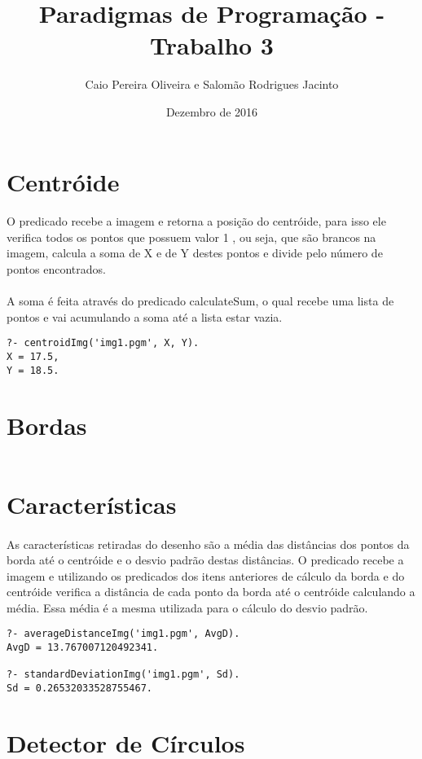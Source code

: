 \documentclass{article}
\title{Paradigmas de Programação - Trabalho 3}
\author{Caio Pereira Oliveira e Salomão Rodrigues Jacinto}
\date{Dezembro de 2016}
\begin{document}
\maketitle

\section{Centróide}

\paragraph{}
O predicado recebe a imagem e retorna a posição do centróide, para isso ele
verifica todos os pontos que possuem valor 1 , ou seja, que são brancos na
imagem, calcula a soma de X e de Y destes pontos e divide pelo número de pontos
encontrados.
\paragraph{}
A soma é feita através do predicado calculateSum, o qual recebe uma lista de
pontos e vai acumulando a soma até a lista estar vazia.

\begin{verbatim}
?- centroidImg('img1.pgm', X, Y).
X = 17.5,
Y = 18.5.
\end{verbatim}

\section{Bordas}

\begin{verbatim}
\end{verbatim}

\section{Características}

\paragraph{}
As características retiradas do desenho são a média das distâncias dos pontos da
borda até o centróide e o desvio padrão destas distâncias. O predicado recebe a
imagem e utilizando os predicados dos itens anteriores de cálculo da borda e do
centróide verifica a distância de cada ponto da borda até o centróide calculando
a média. Essa média é a mesma utilizada para o cálculo do desvio padrão.

\begin{verbatim}
?- averageDistanceImg('img1.pgm', AvgD).
AvgD = 13.767007120492341.

?- standardDeviationImg('img1.pgm', Sd).
Sd = 0.26532033528755467.
\end{verbatim}

\section{Detector de Círculos}

\begin{verbatim}
\end{verbatim}
\end{document}
